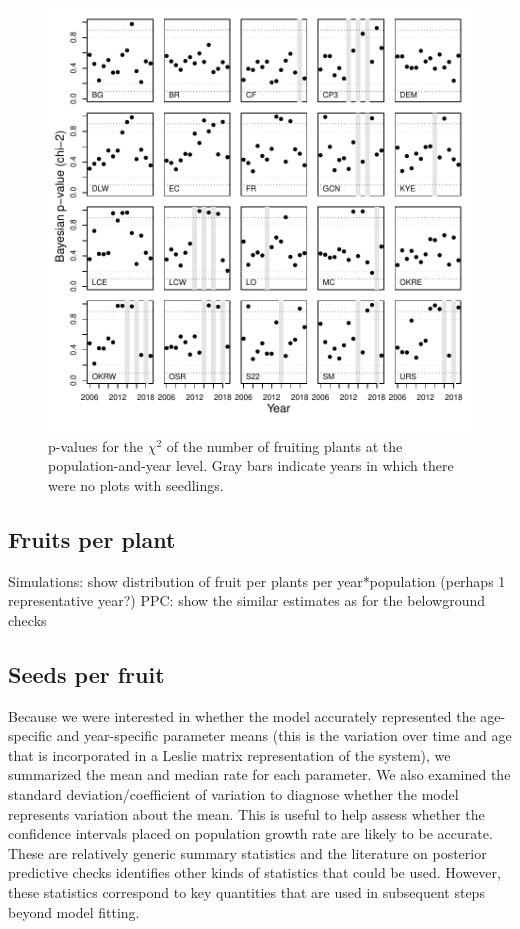 \documentclass[12pt, oneside, titlepage]{article}   	%
\begin{document}
\begin{figure}[!h]
   \centering
       \includegraphics[page=1,width=\textwidth]{../../figures/modelChecks/seedlingSurvivalFruiting-zerotrials.pdf}  
    \caption{ p-values for the $\chi^2$ of the number of fruiting plants at the population-and-year level. Gray bars indicate years in which there were no plots with seedlings.  }
 \label{fig:name}
\end{figure}

\subsection{Fruits per plant}

Simulations: show distribution of fruit per plants per year*population (perhaps 1 representative year?)
PPC: show the similar estimates as for the belowground checks

\subsection{Seeds per fruit}







Because we were interested in whether the model accurately represented the age-specific and year-specific parameter means (this is the variation over time and age that is incorporated in a Leslie matrix representation of the system), we summarized the mean and median rate for each parameter. We also examined the standard deviation/coefficient of variation to diagnose whether the model represents variation about the mean. This is useful to help assess whether the confidence intervals placed on population growth rate are likely to be accurate. These are relatively generic summary statistics and the literature on posterior predictive checks identifies other kinds of statistics that could be used. However, these statistics correspond to key quantities that are used in subsequent steps beyond model fitting. 
\end{document}
